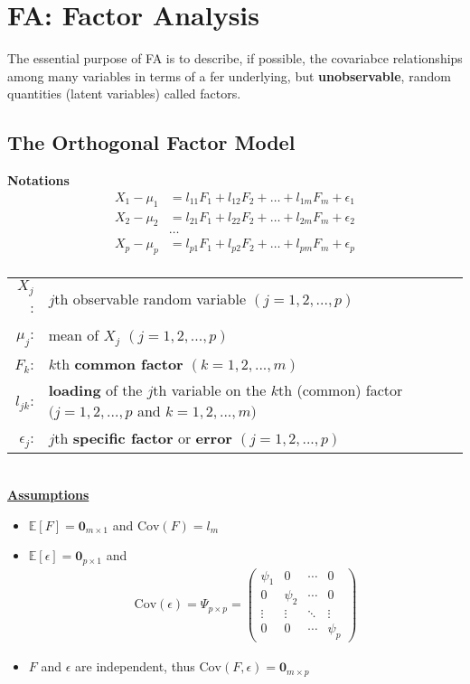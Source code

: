 \documentclass[12pt]{extarticle}
\newcommand{\<}{\langle}
\renewcommand{\>}{\rangle}
\theoremstyle{definition}
\begin{document}
\newpage
\section{FA: Factor Analysis}
The essential purpose of FA is to describe, if possible, the covariabce relationships among many variables in terms of a fer underlying, but \textbf{unobservable}, random quantities (latent variables) called factors.

\subsection{The Orthogonal Factor Model}
\textbf{Notations}
\begin{align*}
    X_1 -\mu_1 &= l_{11}F_1 +l_{12}F_2 + \dots + l_{1m}F_m + \epsilon_1\\
    X_2 -\mu_2 &= l_{21}F_1 +l_{22}F_2 + \dots + l_{2m}F_m + \epsilon_2\\
    &\dots \\
    X_p -\mu_p &= l_{p1}F_1 +l_{p2}F_2 + \dots + l_{pm}F_m + \epsilon_p\\
\end{align*}

\begin{tabular}{rl}
$X_j$:& $j$th observable random variable $(j=1,2,...,p)$\\
$\mu_j$:& mean of $X_j$ $(j=1,2,...,p)$\\
$F_k$:& $k$th \textbf{common factor} $(k=1,2,...,m)$\\
$l_{jk}$:& \textbf{loading} of the $j$th variable on the $k$th (common) factor $(j=1,2,...,p$ and $k=1,2,...,m)$\\
$\epsilon_j$:& $j$th \textbf{specific factor} or \textbf{error} $(j=1,2,...,p)$
\end{tabular}\\

\underline{\textbf{Assumptions}}
\begin{itemize}
    \item $\mathbb{E}[F]= \textbf{0}_{m\times 1}$ and $\text{Cov}(F)=l_m$ \\
    \item $\mathbb{E}[\epsilon]=\textbf{0}_{p\times 1}$ and
    \begin{align*}
        \text{Cov}(\epsilon) =\Psi_{p\times p} = \left(\begin{array}{cccc}
        \psi_1 & 0 & \cdots & 0 \\
        0 & \psi_2 & \cdots & 0 \\
        \vdots & \vdots & \ddots & \vdots \\
        0 & 0 & \cdots & \psi_p
        \end{array} \right) 
    \end{align*}
    \item $F$ and $\epsilon$ are independent, thus $\text{Cov}(F,\epsilon) =\textbf{0}_{m\times p}$
\end{itemize}
\end{document}

